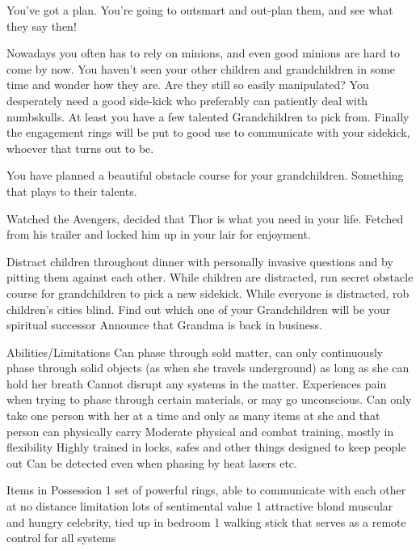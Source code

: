 \documentclass[char]{LRSguildcamp1}
\begin{document}
You've got a plan. You're  going to outsmart and out-plan them, and see what they say then! 

Nowadays you often has to rely on minions, and even good minions are hard to come by now. You haven't seen your other children and grandchildren in some time and wonder how they are. Are they still so easily manipulated? You desperately need a good side-kick who preferably can patiently deal with numbskulls.  At least you have a few talented Grandchildren to pick from. Finally the engagement rings will be put to good use to communicate with your sidekick, whoever that turns out to be. 

You have planned a beautiful obstacle course for your grandchildren. Something that plays to their talents. 

Watched the Avengers, decided that Thor is what you need in your life. Fetched \cChrisHemsworth{\intro} from his trailer and locked him up in your lair for enjoyment.

\begin{itemz}[Goals]
	\item 
	Distract children throughout dinner with personally invasive questions and by pitting them against each other. 
	While children are distracted, run secret obstacle course for grandchildren to pick a new sidekick. 
	While everyone is distracted, rob children’s cities blind. 
	Find out which one of your Grandchildren will be your spiritual successor 
	Announce that Grandma is back in business. 
	
\end{itemz}

\begin{itemz}[Notes]
	\item 
	
	Abilities/Limitations 
	Can phase through sold matter, can only continuously phase through solid objects (as when she travels underground) as long as she can hold her breath 
	Cannot disrupt any systems in the matter. 
	Experiences pain when trying to phase through certain materials, or may go unconscious. 
	Can only take one person with her at a time and only as many items at she and that person can physically carry 
	Moderate physical and combat training, mostly in flexibility 
	Highly trained in locks, safes and other things designed to keep people out 
	Can be detected even when phasing by heat lasers etc. 
	
	Items in Possession
	1 set of powerful rings, able to communicate with each other at no distance limitation lots of sentimental value 
	1 attractive blond muscular and hungry celebrity, tied up in bedroom 
	1 walking stick that serves as a remote control for all systems 
	
\end{itemz}
\end{document}
